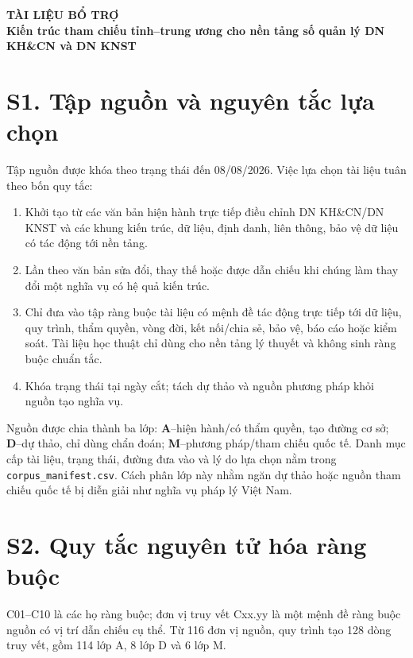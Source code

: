 \documentclass[a4paper,11pt]{article}
\begin{document}
\begin{center}
{\bfseries TÀI LIỆU BỔ TRỢ\\
Kiến trúc tham chiếu tỉnh--trung ương cho nền tảng số quản lý DN KH\&CN và DN KNST}
\end{center}

\section*{S1. Tập nguồn và nguyên tắc lựa chọn}
Tập nguồn được khóa theo trạng thái đến 08/08/2026. Việc lựa chọn tài liệu tuân theo bốn quy tắc:
\begin{enumerate}[label=\textbf{D\arabic*.}]
\item Khởi tạo từ các văn bản hiện hành trực tiếp điều chỉnh DN KH\&CN/DN KNST và các khung kiến trúc, dữ liệu, định danh, liên thông, bảo vệ dữ liệu có tác động tới nền tảng.
\item Lần theo văn bản sửa đổi, thay thế hoặc được dẫn chiếu khi chúng làm thay đổi một nghĩa vụ có hệ quả kiến trúc.
\item Chỉ đưa vào tập ràng buộc tài liệu có mệnh đề tác động trực tiếp tới dữ liệu, quy trình, thẩm quyền, vòng đời, kết nối/chia sẻ, bảo vệ, báo cáo hoặc kiểm soát. Tài liệu học thuật chỉ dùng cho nền tảng lý thuyết và không sinh ràng buộc chuẩn tắc.
\item Khóa trạng thái tại ngày cắt; tách dự thảo và nguồn phương pháp khỏi nguồn tạo nghĩa vụ.
\end{enumerate}

Nguồn được chia thành ba lớp: \textbf{A}--hiện hành/có thẩm quyền, tạo đường cơ sở; \textbf{D}--dự thảo, chỉ dùng chẩn đoán; \textbf{M}--phương pháp/tham chiếu quốc tế. Danh mục cấp tài liệu, trạng thái, đường đưa vào và lý do lựa chọn nằm trong \texttt{corpus\_manifest.csv}. Cách phân lớp này nhằm ngăn dự thảo hoặc nguồn tham chiếu quốc tế bị diễn giải như nghĩa vụ pháp lý Việt Nam.

\section*{S2. Quy tắc nguyên tử hóa ràng buộc}
C01--C10 là các họ ràng buộc; đơn vị truy vết Cxx.yy là một mệnh đề ràng buộc nguồn có vị trí dẫn chiếu cụ thể. Từ 116 đơn vị nguồn, quy trình tạo 128 dòng truy vết, gồm 114 lớp A, 8 lớp D và 6 lớp M.
\end{document}
